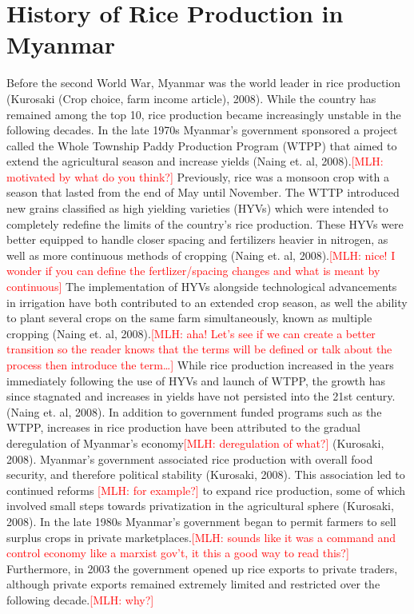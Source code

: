 \documentclass{book}\usepackage{knitr}
\newcommand{\red}[1]{\textcolor{red}{[MLH: #1]}}
\begin{document}
{\section{History of Rice Production in Myanmar}

Before the second World War, Myanmar was the world leader in rice production (Kurosaki (Crop choice, farm income article), 2008). While the country has remained among the top 10, rice production became increasingly unstable in the following decades. In the late 1970s Myanmar’s government sponsored a project called the Whole Township Paddy Production Program (WTPP) that aimed to extend the agricultural season and increase yields (Naing et. al, 2008).\red{motivated by what do you think?} Previously, rice was a monsoon crop with a season that lasted from the end of May until November. The WTTP introduced new grains classified as high yielding varieties (HYVs) which were intended to completely redefine the limits of the country’s rice production. These HYVs were better equipped to handle closer spacing and fertilizers heavier in nitrogen, as well as more continuous methods of cropping (Naing et. al, 2008).\red{nice!  I wonder if you can define the fertlizer/spacing changes and what is meant by continuous}
	The implementation of HYVs alongside technological advancements in irrigation have both contributed to an extended crop season, as well the ability to plant several crops on the same farm simultaneously, known as multiple cropping (Naing et. al, 2008).\red{aha!  Let's see if we can create a better transition so the reader knows that the terms will be defined or talk about the process then introduce the term\ldots} While rice production increased in the years immediately following the use of HYVs and launch of WTPP, the growth has since stagnated and increases in yields have not persisted into the 21st century. (Naing et. al, 2008).
	In addition to government funded programs such as the WTPP, increases in rice production have been attributed to the gradual deregulation of Myanmar’s economy\red{deregulation of what?} (Kurosaki, 2008). Myanmar’s government associated rice production with overall food security, and therefore political stability (Kurosaki, 2008). This association led to continued reforms \red{for example?} to expand rice production, some of which involved small steps towards privatization in the agricultural sphere (Kurosaki, 2008). In the late 1980s Myanmar’s government began to permit farmers to sell surplus crops in private marketplaces.\red{sounds like it was a command and control economy like a marxist gov't, it this a good way to read this?} Furthermore, in 2003 the government opened up rice exports to private traders, although private exports remained extremely limited and restricted over the following decade.\red{why?} 
}
\end{document}
